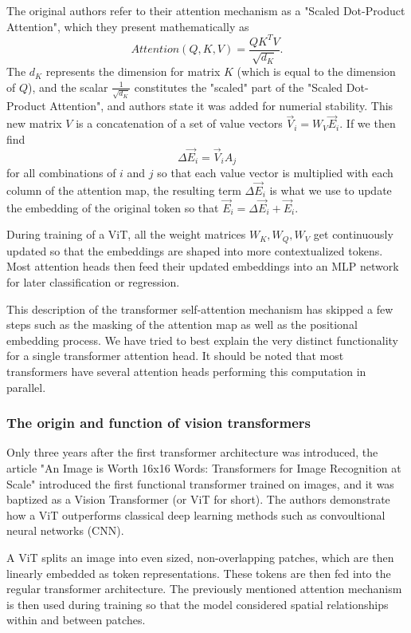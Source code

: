 The original authors refer to their attention mechanism as a "Scaled Dot-Product Attention", which they present mathematically as
\begin{equation}
    Attention(Q, K, V) = \frac{QK^T V}{\sqrt{d_K}}.
\end{equation}
The $d_K$ represents the dimension for matrix $K$ (which is equal to the dimension of $Q$), and the scalar $\frac{1}{\sqrt{d_K}}$ constitutes the "scaled" part of the "Scaled Dot-Product Attention", and authors state it was added for numerial stability. This new matrix $V$ is a concatenation of a set of value vectors $\vec{V}_i = W_V\vec{E}_i$. If we then find
\begin{equation}
    \Delta\vec{E}_i = \vec{V}_i A_j  
\end{equation}
for all combinations of $i$ and $j$ so that each value vector is multiplied with each column of the attention map, the resulting term $\Delta\vec{E}_i$ is what we use to update the embedding of the original token so that $\vec{E}_i  = \Delta\vec{E}_i + \vec{E}_i $. 

During training of a ViT, all the weight matrices $W_K, W_Q , W_V$ get continuously updated so that the embeddings are shaped into more contextualized tokens. Most attention heads then feed their updated embeddings into an MLP network for later classification or regression. 

This description of the transformer self-attention mechanism has skipped a few steps such as the masking of the attention map as well as the positional embedding process. We have tried to best explain the very distinct functionality for a single transformer attention head. It should be noted that most transformers have several attention heads performing this computation in parallel. 

\subsubsection{The origin and function of vision transformers}
Only three years after the first transformer architecture was introduced, the article 
"An Image is Worth 16x16 Words: Transformers for Image Recognition at Scale" \cite{first_vit}
introduced the first functional transformer trained on images, and it was baptized as a Vision
Transformer (or ViT for short). The authors demonstrate how a ViT outperforms classical 
deep learning methods such as convoultional neural networks (CNN). 

A ViT splits an image into even sized, non-overlapping patches, which are then linearly embedded
as token representations. These tokens are then fed into the regular transformer architecture. The previously mentioned attention mechanism is then used during training
so that the model considered spatial relationships within and between patches. 

